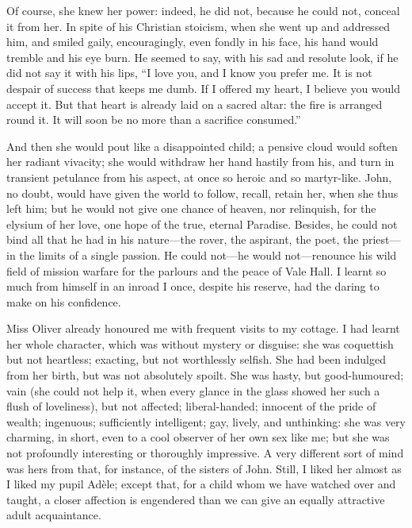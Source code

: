 Of course, she knew her power: indeed, he did not, because he could not,
conceal it from her. In spite of his Christian stoicism, when she went
up and addressed him, and smiled gaily, encouragingly, even fondly in
his face, his hand would tremble and his eye burn. He seemed to say,
with his sad and resolute look, if he did not say it with his lips,
\enquote{I love you, and I know you prefer me. It is not despair of
success that keeps me dumb. If I offered my heart, I believe you would
accept it. But that heart is already laid on a sacred altar: the fire
is arranged round it. It will soon be no more than a sacrifice
consumed.}

And then she would pout like a disappointed child; a pensive cloud would
soften her radiant vivacity; she would withdraw her hand hastily from
his, and turn in transient petulance from his aspect, at once so heroic
and so martyr-like. \St{} John, no doubt, would have given the world to
follow, recall, retain her, when she thus left him; but he would not
give one chance of heaven, nor relinquish, for the elysium of her love,
one hope of the true, eternal Paradise. Besides, he could not bind all
that he had in his nature---the rover, the aspirant, the poet, the
priest---in the limits of a single passion. He could not---he would
not---renounce his wild field of mission warfare for the parlours and
the peace of Vale Hall. I learnt so much from himself in an inroad I
once, despite his reserve, had the daring to make on his confidence.

Miss Oliver already honoured me with frequent visits to my cottage. I
had learnt her whole character, which was without mystery or disguise:
she was coquettish but not heartless; exacting, but not worthlessly
selfish. She had been indulged from her birth, but was not absolutely
spoilt. She was hasty, but good-humoured; vain (she could not help it,
when every glance in the glass showed her such a flush of loveliness),
but not affected; liberal-handed; innocent of the pride of wealth;
ingenuous; sufficiently intelligent; gay, lively, and unthinking: she
was very charming, in short, even to a cool observer of her own sex like
me; but she was not profoundly interesting or thoroughly impressive. A
very different sort of mind was hers from that, for instance, of the
sisters of \St{} John. Still, I liked her almost as I liked my pupil
Adèle; except that, for a child whom we have watched over and taught, a
closer affection is engendered than we can give an equally attractive
adult acquaintance.

